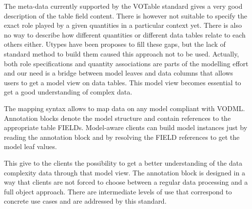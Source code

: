 The meta-data currently supported by the  VOTable standard gives a very good description of the table field content. 
There is however not suitable to specify the exact role played by a given quantities in a particular context yet.
There is also no way to describe how different quantities or different data tables relate to each others either.
Utypes have been proposes to fill these gaps, but the lack of standard method to build them caused this approach not to be used.
Actually, both role specifications and quantity associations are parts of the modelling effort and our need is a bridge between model leaves and data columns that allows users to get a model view on data tables.
This model view becomes essential to get a good  understanding of complex data.

The mapping syntax allows to map data on any model compliant with VODML. 
Annotation blocks denote the model structure and contain references to the appropriate table
FIELDs. Model-aware clients can build model instances just by reading the annotation
block and by resolving the FIELD references to get the model leaf values. 

This give to the clients the possibility to get a better  understanding of the data complexity data through that model view.
The annotation block is designed in a way that clients are not forced to choose between a regular data processing and a full object approach.
There are intermediate levels of use that correspond to concrete use cases and are addressed by this standard.



